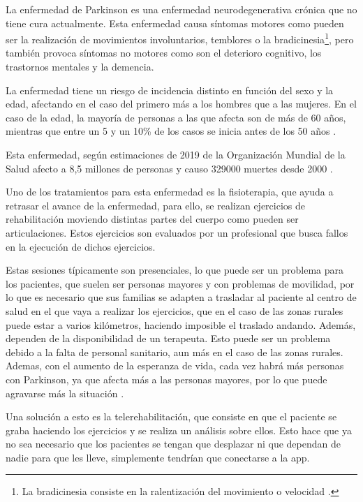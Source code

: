 
La enfermedad de Parkinson es una enfermedad neurodegenerativa crónica que no tiene cura actualmente. Esta enfermedad causa síntomas motores como pueden ser la realización de movimientos involuntarios, temblores o la bradicinesia\footnote{La bradicinesia consiste en la ralentización del movimiento o velocidad \cite{bradicinesia}.}, pero también provoca síntomas no motores como son el deterioro cognitivo, los trastornos mentales y la demencia.  

La enfermedad tiene un riesgo de incidencia distinto en función del sexo y la edad, afectando en el caso del primero más a los hombres que a las mujeres. En el caso de la edad, la mayoría de personas a las que afecta son de más de 60 años, mientras que entre un 5 y un 10\% de los casos se inicia antes de los 50 años \cite{parkinson:causas}.

Esta enfermedad, según estimaciones de 2019 de la Organización Mundial de la Salud afecto a 8,5 millones de personas y causo 329000 muertes desde 2000 \cite{parkinson:oms}.

Uno de los tratamientos para esta enfermedad es la fisioterapia, que ayuda a retrasar el avance de la enfermedad, para ello, se realizan ejercicios de rehabilitación moviendo distintas partes del cuerpo como pueden ser articulaciones. Estos ejercicios son evaluados por un profesional que busca fallos en la ejecución de dichos ejercicios. 

Estas sesiones típicamente son presenciales, lo que puede ser un problema para los pacientes, que suelen ser personas mayores y con problemas de movilidad, por lo que es necesario que sus familias se adapten a trasladar al paciente al centro de salud en el que vaya a realizar los ejercicios, que en el caso de las zonas rurales puede estar a varios kilómetros, haciendo imposible el traslado andando. Además, dependen de la disponibilidad de un terapeuta. Esto puede ser un problema debido a la falta de personal sanitario, aun más en el caso de las zonas rurales. Ademas, con el aumento de la esperanza de vida, cada vez habrá más personas con Parkinson, ya que afecta más a las personas mayores, por lo que puede agravarse más la situación \cite{parkinson:impact}.  

Una solución a esto es la telerehabilitación, que consiste en que el paciente se graba haciendo los ejercicios y se realiza un análisis sobre ellos. Esto hace que ya no sea necesario que los pacientes se tengan que desplazar ni que dependan de nadie para que les lleve, simplemente tendrían que conectarse a la app.

